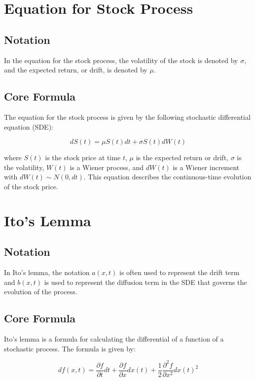 \documentclass{article}
\theoremstyle{mytheoremstyle}
\theoremstyle{mytheoremstyle}
\theoremstyle{myproblemstyle}
\begin{document}
\section{Equation for Stock Process}

\subsection{Notation}
In the equation for the stock process, the volatility of the stock is denoted by $\sigma$, and the expected return, or drift, is denoted by $\mu$.

\subsection{Core Formula}
The equation for the stock process is given by the following stochastic differential equation (SDE):

\begin{equation}
dS(t) = \mu S(t) dt + \sigma S(t) dW(t)
\end{equation}

where $S(t)$ is the stock price at time $t$, $\mu$ is the expected return or drift, $\sigma$ is the volatility, $W(t)$ is a Wiener process, and $dW(t)$ is a Wiener increment with $dW(t) \sim N(0, dt)$. This equation describes the continuous-time evolution of the stock price.

\section{Ito's Lemma}

\subsection{Notation}
In Ito's lemma, the notation $a(x,t)$ is often used to represent the drift term and $b(x,t)$ is used to represent the diffusion term in the SDE that governs the evolution of the process.

\subsection{Core Formula}
Ito's lemma is a formula for calculating the differential of a function of a stochastic process. The formula is given by:

\begin{equation}
df(x,t) = \frac{\partial f}{\partial t} dt + \frac{\partial f}{\partial x} d x(t) + \frac{1}{2} \frac{\partial^2 f}{\partial x^2} d x(t)^2
\end{equation}
\end{document}
